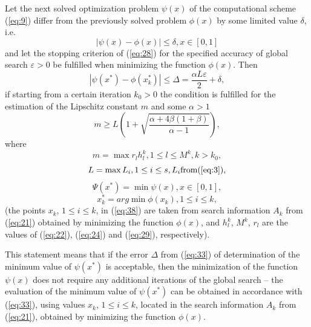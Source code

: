 \documentclass[smallextended]{svjour3}       %
\begin{document}
\begin{theorem}
Let the next solved optimization problem $\psi(x)$ of the computational scheme (\ref{eq:9}) differ from the previously solved problem $\phi(x)$ by some limited value $\delta$, i.e.
\begin{equation}\label{eq:32}
|\psi(x)-\phi(x)| \leq \delta, x \in [0,1]
\end{equation}
and let the stopping criterion of (\ref{eq:28}) for the specified accuracy of global search $\varepsilon>0$ be fulfilled when minimizing the function $\phi(x)$. Then 
\begin{equation}\label{eq:33}
|\psi(x^*)-\phi(x_k^*)| \leq \Delta = \frac{\alpha L \varepsilon}{2} + \delta,
\end{equation}
if starting from a certain iteration $k_0>0$ the condition is fulfilled for the estimation of the Lipschitz constant $m$ and some $\alpha > 1$
\begin{equation}\label{eq:34}
m \geq L (1+ \sqrt{\frac{\alpha + 4 \beta (1 + \beta)}{\alpha - 1}}),
\end{equation}
where
\begin{equation}\label{eq:35}
m=\max{r_l h_l^k}, 1 \leq l \leq M^k, k>k_0,
\end{equation}
\begin{equation}\label{eq:36}
L=\max{L_i}, 1 \leq i \leq s, L_i \text{from} (\ref{eq:3}),
\end{equation}
\begin{equation}\label{eq:37}
\Psi(x^*)=\min{\psi(x)},x \in [0,1],
\end{equation}
\begin{equation}\label{eq:38}
x_k^* = arg \min{\phi(x_k)}, 1 \leq i \leq k, 
\end{equation}
(the points $x_k$, $1 \leq i \leq k$, in (\ref{eq:38}) are taken from search information $A_k$ from (\ref{eq:21}) obtained by minimizing the function $\phi(x)$, and $h_l^k$, $M^k$, $r_l$ are the values of (\ref{eq:22}), (\ref{eq:24}) and (\ref{eq:29}), respectively).
\end{theorem}

This statement means that if the error $\Delta$ from (\ref{eq:33}) of determination of the minimum value of $\psi(x^*)$ is acceptable, then the minimization of the function $\psi(x)$ does not require any additional iterations of the global search -- the evaluation of the minimum value of $\psi(x^*)$ can be obtained in accordance with (\ref{eq:33}), using values $x_k$, ${1 \leq i \leq k}$, located in the search information $A_k$ from (\ref{eq:21}), obtained by minimizing the function $\phi(x)$.
\end{document}
